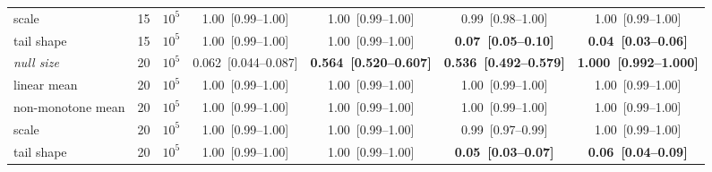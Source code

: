 \begin{table}[p]
{\begin{tabular}{llrcccc}
scale & 15 & $10^5$ & 1.00~[0.99--1.00] & 1.00~[0.99--1.00] & 0.99~[0.98--1.00] & 1.00~[0.99--1.00] \\
tail shape & 15 & $10^5$ & 1.00~[0.99--1.00] & 1.00~[0.99--1.00] & \textbf{0.07~[0.05--0.10]} & \textbf{0.04~[0.03--0.06]} \\
\midrule
\emph{null size} & 20 & $10^5$ & 0.062~[0.044--0.087] & \textbf{0.564~[0.520--0.607]} & \textbf{0.536~[0.492--0.579]} & \textbf{1.000~[0.992--1.000]} \\
linear mean & 20 & $10^5$ & 1.00~[0.99--1.00] & 1.00~[0.99--1.00] & 1.00~[0.99--1.00] & 1.00~[0.99--1.00] \\
non-monotone mean & 20 & $10^5$ & 1.00~[0.99--1.00] & 1.00~[0.99--1.00] & 1.00~[0.99--1.00] & 1.00~[0.99--1.00] \\
scale & 20 & $10^5$ & 1.00~[0.99--1.00] & 1.00~[0.99--1.00] & 0.99~[0.97--0.99] & 1.00~[0.99--1.00] \\
tail shape & 20 & $10^5$ & 1.00~[0.99--1.00] & 1.00~[0.99--1.00] & \textbf{0.05~[0.03--0.07]} & \textbf{0.06~[0.04--0.09]} \\
\bottomrule
\end{tabular}}
\end{table}
